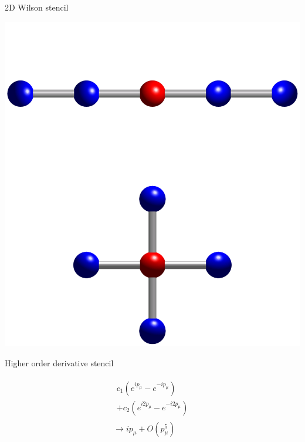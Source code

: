 \documentclass[pdf,ps,8pt]{beamer}
\begin{document}
\begin{frame}[fragile]
\begin{columns}
\begin{column}{0.3\textwidth}
      2D Wilson stencil
      
      \includegraphics[width=\textwidth]{StencilNaik.pdf}

      Higher order derivative stencil

    \begin{eqnarray*}
      \begin{array}{c} c_1 (e^{ip_\mu} - e^{-ip_\mu}) \\ + c_2 (e^{i2 p_\mu} - e^{-i2 p_\mu})\end{array} \\
      \to  i p_\mu + O(p_\mu^5)
      \end{eqnarray*}
    \end{column}
  \end{columns}
\end{frame}
\end{document}
